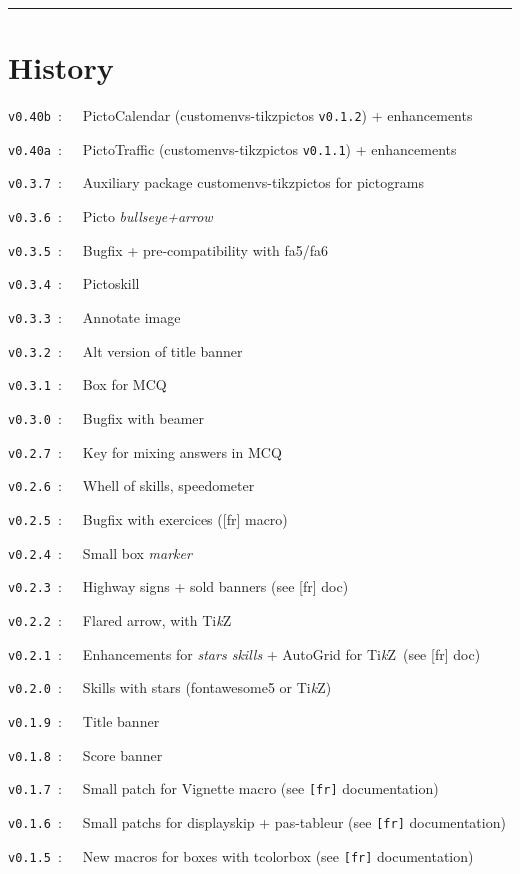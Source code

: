 \documentclass[english,11pt,a4paper]{article}
\providecommand\tikzlogo{Ti\textit{k}Z}
\let\TikZ\tikzlogo
\begin{document}
\hrule

\vfill

\section{History}

\verb|v0.40b|~:~~~PictoCalendar (\textsf{customenvs-tikzpictos} \texttt{v0.1.2}) + enhancements

\verb|v0.40a|~:~~~PictoTraffic (\textsf{customenvs-tikzpictos} \texttt{v0.1.1}) + enhancements

\verb|v0.3.7|~:~~~Auxiliary package \textsf{customenvs-tikzpictos} for pictograms

\verb|v0.3.6|~:~~~Picto \textit{bullseye+arrow}

\verb|v0.3.5|~:~~~Bugfix + pre-compatibility with \textsf{fa5/fa6}

\verb|v0.3.4|~:~~~Pictoskill

\verb|v0.3.3|~:~~~Annotate image

\verb|v0.3.2|~:~~~Alt version of title banner

\verb|v0.3.1|~:~~~Box for MCQ

\verb|v0.3.0|~:~~~Bugfix with \textsf{beamer}

\verb|v0.2.7|~:~~~Key for mixing answers in MCQ

\verb|v0.2.6|~:~~~Whell of skills, speedometer

\verb|v0.2.5|~:~~~Bugfix with exercices (\textsf{[fr]} macro)

\verb|v0.2.4|~:~~~Small box \textit{marker}

\verb|v0.2.3|~:~~~Highway signs + sold banners (see \textsf{[fr]} doc)

\verb|v0.2.2|~:~~~Flared arrow, with \TikZ

\verb|v0.2.1|~:~~~Enhancements for \textit{stars skills} + AutoGrid for \TikZ\ (see \textsf{[fr]} doc)

\verb|v0.2.0|~:~~~Skills with stars (\textsf{fontawesome5} or \TikZ)

\verb|v0.1.9|~:~~~Title banner

\verb|v0.1.8|~:~~~Score banner

\verb|v0.1.7|~:~~~Small patch for \textsf{Vignette} macro (see \texttt{[fr]} documentation)

\verb|v0.1.6|~:~~~Small patchs for \textsf{displayskip} + \textsf{pas-tableur} (see \texttt{[fr]} documentation)

\verb|v0.1.5|~:~~~New macros for boxes with \textsf{tcolorbox} (see \texttt{[fr]} documentation)
\end{document}
